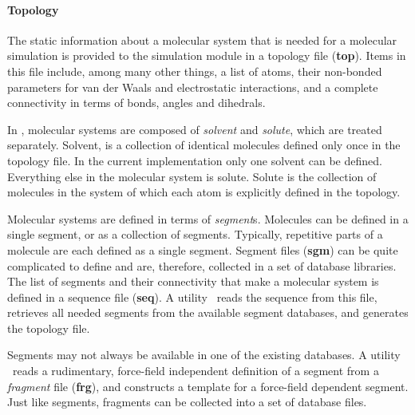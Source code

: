 \paragraph{Topology}
\label{topology}
The static information about a molecular system that is needed for
a molecular simulation is provided to the simulation module in a
topology file ({\bf top}). 
Items in this file include, among many other things, 
a list of atoms, their non-bonded parameters for van der Waals and
electrostatic interactions, and a complete connectivity in terms
of bonds, angles and dihedrals.
\par
In \nwargos, molecular systems are composed of {\it solvent} and 
{\it solute}, which are treated separately. Solvent, is a collection 
of identical molecules defined only once in the topology file. In the
current implementation only one solvent can be defined. Everything
else in the molecular system is solute. Solute is the collection of
molecules in the system of which each atom is explicitly defined in
the topology. 
\par
Molecular systems are defined in terms of {\it segment}s. Molecules
can be defined in a single segment, or as a collection of segments.
Typically, repetitive parts of a molecule are each defined as a single
segment. Segment files ({\bf sgm}) can be quite complicated to define 
and are, therefore, collected in a set of database libraries. 
The list of segments and their connectivity that make a molecular system 
is defined in a sequence file ({\bf seq}). 
A utility \nwtop\ reads the sequence from this file, retrieves all 
needed segments from the available segment databases, and generates the
topology file.
\par
Segments may not always be available in one of the existing databases.
A utility \nwsgm\ reads a rudimentary, force-field independent
definition of a segment from a {\it fragment} file ({\bf frg}), and 
constructs a template for a force-field dependent segment. 
Just like segments, fragments can be collected into a set of database files.
